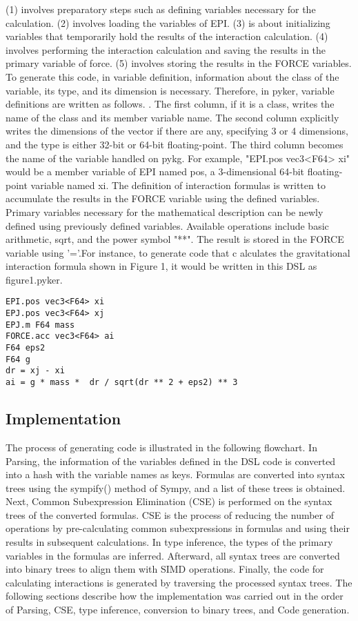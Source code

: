 \documentclass[ams, a4j]{U-AizuGT}
\begin{document}
(1) involves preparatory steps such as defining variables necessary for the calculation. (2) 
involves loading the variables of EPI. (3) is about initializing variables that temporarily
 hold the results of the interaction calculation. (4) involves performing the interaction 
 calculation and saving the results in the primary variable of force. (5) involves storing the results in the FORCE variables.
To generate this code, in variable definition, information about the class of the variable,
 its type, and its dimension is necessary. Therefore, in pyker, variable definitions are written as follows. .
The first column, if it is a class, writes the name of the class and its member variable
 name. The second column explicitly writes the dimensions of the vector if there are any, 
 specifying 3 or 4 dimensions, and the type is either 32-bit or 64-bit floating-point. The 
 third column becomes the name of the variable handled on pykg. For example, "EPI.pos vec3<F64> xi" 
 would be a member variable of EPI named pos, a 3-dimensional 64-bit floating-point variable named xi.
The definition of interaction formulas is written to accumulate the results in the FORCE variable using
 the defined variables. Primary variables necessary for the mathematical description can be newly defined 
 using previously defined variables. Available operations include basic arithmetic, sqrt, and the power 
 symbol "**". The result is stored in the FORCE variable using '='.For instance, to generate code that c
 alculates the gravitational interaction formula shown in Figure 1, it would be written in this DSL as figure1.pyker.


\begin{lstlisting}[frame=single, caption=hoge, label=fuga]
EPI.pos vec3<F64> xi
EPJ.pos vec3<F64> xj
EPJ.m F64 mass
FORCE.acc vec3<F64> ai
F64 eps2
F64 g
dr = xj - xi
ai = g * mass *  dr / sqrt(dr ** 2 + eps2) ** 3
\end{lstlisting}
\subsection{Implementation}
The process of generating code is illustrated in the following flowchart. In Parsing, the information
of the variables defined in the DSL code is converted into a hash with the variable names as keys. 
Formulas are converted into syntax trees using the sympify() method of Sympy, and a list of these 
trees is obtained. Next, Common Subexpression Elimination (CSE) is performed on the syntax trees of the converted formulas. CSE is the process 
of reducing the number of operations by pre-calculating common subexpressions in formulas and using 
their results in subsequent calculations. In type inference, the types of the primary variables in the 
formulas are inferred. Afterward, all syntax trees are converted into binary trees to align them with 
SIMD operations. Finally, the code for calculating interactions is generated by traversing the processed 
syntax trees. The following sections describe how the implementation was carried out in the order of
Parsing, CSE, type inference, conversion to binary trees, and Code generation.
\end{document}
